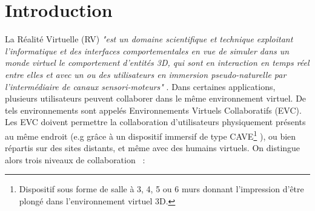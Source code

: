 \documentclass[11pt]{article}
\begin{document}
\section{Introduction}


La Réalité Virtuelle (RV) \textit{"est un domaine scientifique et technique exploitant l’informatique et des interfaces comportementales en vue de simuler dans un monde virtuel le comportement d’entités 3D, qui sont en interaction en temps réel entre elles et avec un ou des utilisateurs en immersion pseudo-naturelle par l’intermédiaire de canaux sensori-moteurs"} \cite{trv1-chap1}. Dans certaines applications, plusieurs utilisateurs peuvent collaborer dans le même environnement virtuel. De tels environnements sont appelés Environnements Virtuels Collaboratifs (EVC). Les EVC doivent permettre la collaboration d'utilisateurs physiquement présents au même endroit (e.g grâce à un dispositif immersif de type CAVE\footnote{Dispositif sous forme de salle à 3, 4, 5 ou 6 murs donnant l'impression d'être plongé dans l'environnement virtuel 3D.} \cite{cave}), ou bien répartis sur des sites distants, et même avec des humains virtuels. On distingue alors trois niveaux de collaboration \cite{margery}~:
\end{document}
